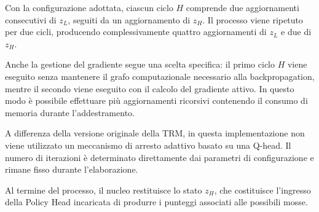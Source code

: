 Con la configurazione adottata, ciascun ciclo $H$ comprende due aggiornamenti consecutivi di $z_L$, seguiti da un aggiornamento di $z_H$. Il processo viene ripetuto per due cicli, producendo complessivamente quattro aggiornamenti di $z_L$ e due di $z_H$.

Anche la gestione del gradiente segue una scelta specifica: il primo ciclo $H$ viene eseguito senza mantenere il grafo computazionale necessario alla backpropagation, mentre il secondo viene eseguito con il calcolo del gradiente attivo. In questo modo è possibile effettuare più aggiornamenti ricorsivi contenendo il consumo di memoria durante l'addestramento.

A differenza della versione originale della TRM, in questa implementazione non viene utilizzato un meccanismo di arresto adattivo basato su una Q-head. Il numero di iterazioni è determinato direttamente dai parametri di configurazione e rimane fisso durante l'elaborazione.

Al termine del processo, il nucleo restituisce lo stato $z_H$, che costituisce l'ingresso della Policy Head incaricata di produrre i punteggi associati alle possibili mosse.
